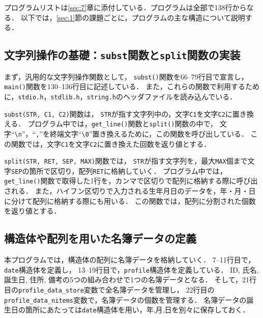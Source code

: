 \documentclass[autodetect-engine,dvi=dvipdfmx,ja=standard,
               a4j,11pt]{bxjsarticle}
\begin{document}
プログラムリストは\ref{sec:7}章に添付している．プログラムは全部で138行からなる．
以下では，\ref{sec:1}節の課題ごとに，プログラムの主な構造について説明する．

\subsection{文字列操作の基礎：\texttt{subst}関数と\texttt{split}関数の実装}

まず，汎用的な文字列操作関数として，
\verb|subst()|関数を66--79行目で宣言し，
\verb|main()|関数を130--136行目に記述している．
また，これらの関数で利用するために，\verb|stdio.h|，\verb|stdlib.h|，\verb|string.h|のヘッダファイルを読み込んでいる．

\verb|subst(STR, C1, C2)|関数は，
\verb|STR|が指す文字列中の，文字\verb|C1|を文字\verb|C2|に置き換える．
プログラム中では，\verb|get_line()|関数と\verb|split()|関数の中で，
文字``\verb|\n|''，``\verb|,|''を終端文字``\verb|\0|''置き換えるために，この関数を呼び出している．
この関数では，文字\verb|C1|を文字\verb|C2|に置き換えた回数を返り値とする．

\verb|split(STR, RET, SEP, MAX)|関数では，
\verb|STR|が指す文字列を，最大\verb|MAX|個まで文字\verb|SEP|の箇所で区切り，配列\verb|RET|に格納していく．
プログラム中では，\verb|get_line()|関数で取得した1行を，カンマで区切りで配列に格納する際に呼び出される．
また，ハイフン区切りで入力される生年月日のデータを，年・月・日に分けて配列に格納する際にも用いる．
この関数では，配列に分割された個数を返り値とする．

\subsection{構造体や配列を用いた名簿データの定義}

本プログラムでは，構造体の配列に名簿データを格納していく．
7--11行目で，\verb|date|構造体を定義し，
13--19行目で，\verb|profile|構造体を定義している．
ID, 氏名, 誕生日, 住所, 備考の5つの組み合わせで1つの名簿データとなる．
そして，21行目の\verb|profile_data_store|変数で全名簿データを管理し，
22行目の\verb|profile_data_nitems|変数で，名簿データの個数を管理する．
名簿データの誕生日の箇所にあたっては\verb|date|構造体を用い，年,月,日を別々に保存しておく．
\end{document}
